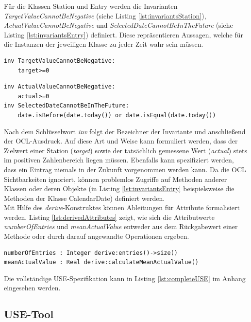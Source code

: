 \documentclass[a4paper,twoside]{article}
\begin{document}
Für die Klassen Station und Entry werden die Invarianten \textit{TargetValueCannotBeNegative} (siehe Listing \ref{lst:invariantsStation}), \textit{ActualValueCannotBeNegative} und \textit{SelectedDateCannotBeInTheFuture} (siehe Listing \ref{lst:invariantsEntry}) definiert. Diese repräsentieren Aussagen, welche für die Instanzen der jeweiligen Klasse zu jeder Zeit wahr sein müssen. \cite[S.188]{OCLFormal}

\begin{lstlisting}[caption={Invariante in der Klasse Station},label=lst:invariantsStation]
inv TargetValueCannotBeNegative:
	target>=0
\end{lstlisting}
\begin{lstlisting}[caption={Invarianten in der Klasse Entry},label=lst:invariantsEntry]
inv ActualValueCannotBeNegative:
	actual>=0
inv SelectedDateCannotBeInTheFuture:
	date.isBefore(date.today()) or date.isEqual(date.today())
\end{lstlisting}

Nach dem Schlüsselwort \textit{inv} folgt der Bezeichner der Invariante und anschließend der OCL-Ausdruck. Auf diese Art und Weise kann formuliert werden, dass der Zielwert einer Station (\textit{target}) sowie der tatsächlich gemessene Wert (\textit{actual}) stets im positiven Zahlenbereich liegen müssen. Ebenfalls kann spezifiziert werden, dass ein Eintrag niemals in der Zukunft vorgenommen werden kann. Da die OCL Sichtbarkeiten ignoriert, können problemlos Zugriffe auf Methoden anderer Klassen oder deren Objekte (in Listing \ref{lst:invariantsEntry} beispielsweise die Methoden der Klasse CalendarDate) definiert werden. \cite[S.71]{OCLFormal}\\
Mit Hilfe des \textit{derive}-Konstruktes können Ableitungen für Attribute formalisiert werden. Listing \ref{lst:derivedAttributes} zeigt, wie sich die Attributwerte \textit{numberOfEntries} und \textit{meanActualValue} entweder aus dem Rückgabewert einer Methode oder durch darauf angewandte Operationen ergeben.
\begin{lstlisting}[caption={Abgeleitete Attribute der Klasse Station},label=lst:derivedAttributes]
numberOfEntries : Integer derive:entries()->size()
meanActualValue : Real derive:calculateMeanActualValue()
\end{lstlisting}

Die vollständige USE-Spezifikation kann in Listing \ref{lst:completeUSE} im Anhang eingesehen werden.
\subsection{USE-Tool}
\end{document}
